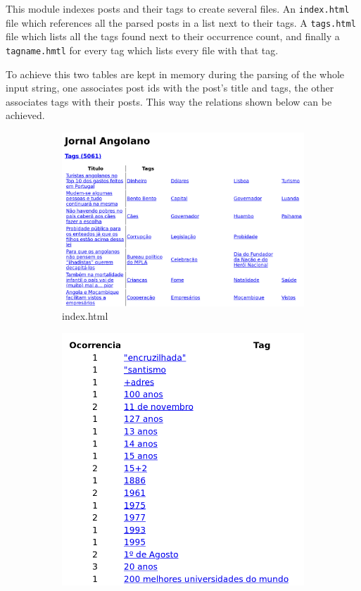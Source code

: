 \documentclass[a4paper]{article}
\begin{document}
This module indexes posts and their tags to create several files. An
\texttt{index.html} file which references all the parsed posts in a list next
to their tags. A \texttt{tags.html} file which lists all the tags found next to
their occurrence count, and finally a \texttt{tagname.hmtl} for every tag
which lists every file with that tag.

To achieve this two tables are kept in memory during the parsing of the whole
input string, one associates post ids with the post's title and tags, the other
associates tags with their posts. This way the relations shown below can be
achieved.

\begin{figure}[H]
    \centering
    \begin{subfigure}{0.54\textwidth}
        \includegraphics[width=\textwidth]{./index_print.png}
        \caption{index.html}
    \end{subfigure}
    \begin{subfigure}{0.45\textwidth}
        \includegraphics[width=\textwidth]{./tags_print.png}

\end{subfigure}
\end{figure}
\end{document}
